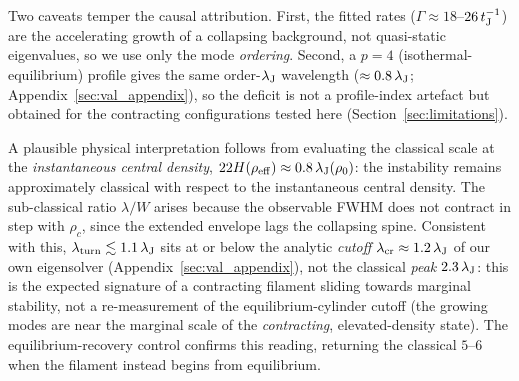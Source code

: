 \documentclass[usenatbib,twoside,twocolumn]{mnras}
\begin{document}
Two caveats temper the causal attribution. First, the fitted rates ($\Gamma\approx18$--$26\,t_{\rm J}^{-1}$) are the accelerating growth of a collapsing background, not quasi-static eigenvalues, so we use only the mode \emph{ordering}. Second, a $p=4$ (isothermal-equilibrium) profile gives the same order-$\lambda_{\rm J}$ wavelength ($\approx0.8\,\lambda_{\rm J}$; Appendix~\ref{sec:val_appendix}), so the deficit is not a profile-index artefact but obtained for the contracting configurations tested here (Section~\ref{sec:limitations}).

A plausible physical interpretation follows from evaluating the classical scale at the \emph{instantaneous central density}, $22H(\rho_{\rm eff})\approx0.8\,\lambda_{\rm J}(\rho_0)$: the instability remains approximately classical with respect to the instantaneous central density. The sub-classical ratio $\lambda/W$ arises because the observable FWHM does not contract in step with $\rho_c$, since the extended envelope lags the collapsing spine. Consistent with this, $\lambda_{\rm turn}\lesssim1.1\,\lambda_{\rm J}$ sits at or below the analytic \emph{cutoff} $\lambda_{\rm cr}\approx1.2\,\lambda_{\rm J}$ of our own eigensolver (Appendix~\ref{sec:val_appendix}), not the classical \emph{peak} $2.3\,\lambda_{\rm J}$: this is the expected signature of a contracting filament sliding towards marginal stability, not a re-measurement of the equilibrium-cylinder cutoff (the growing modes are near the marginal scale of the \emph{contracting}, elevated-density state). The equilibrium-recovery control confirms this reading, returning the classical $5$--$6$ when the filament instead begins from equilibrium.
\end{document}
